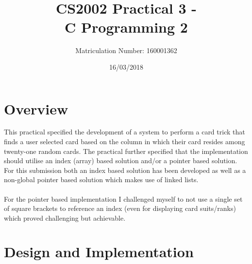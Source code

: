 \documentclass[11]{article}
\title{CS2002 Practical 3 - \\C Programming 2}
\date{16/03/2018}
\author{Matriculation Number: 160001362}
\begin{document}
	\maketitle
	\newpage
	\tableofcontents
	
	\newpage
	\section{Overview}
	This practical specified the development of a system to perform a card trick that finds a user selected card based on the column in which their card resides among twenty-one random cards. The practical further specified that the implementation should utilise an index (array) based solution and/or a pointer based solution. For this submission both an index based solution has been developed as well as a non-global pointer based solution which makes use of linked lists. \\\\For the pointer based implementation I challenged myself to not use a single set of square brackets to reference an index (even for displaying card suits/ranks) which proved challenging but achievable.
	\section{Design and Implementation}
\end{document}
